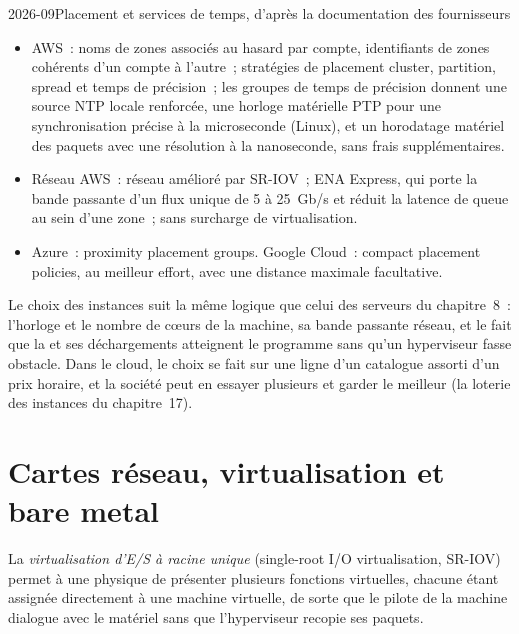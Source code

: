 \begin{dated}{2026-09}{Placement et services de temps, d'après la documentation des fournisseurs}\label{dat:nw:trading-in-a-public-cloud:docs}
\begin{itemize}
\item AWS~: noms de zones associés au hasard par compte, identifiants de zones cohérents d'un compte à l'autre~; stratégies de placement cluster, partition, spread et
  temps de précision~; les groupes de temps de précision donnent une source NTP locale renforcée, une horloge matérielle PTP pour une synchronisation précise à la microseconde (Linux),
  et un horodatage matériel des paquets avec une résolution à la nanoseconde, sans frais supplémentaires.
\item Réseau AWS~: réseau amélioré par SR-IOV~; ENA Express, qui porte la bande passante d'un flux unique de 5 à 25~Gb/s et réduit la
  latence de queue au sein d'une zone~;  sans surcharge de virtualisation.
\item Azure~: proximity placement groups. Google Cloud~: compact placement policies, au meilleur effort, avec une distance maximale facultative.
\end{itemize}
\end{dated}

Le choix des instances suit la même logique que celui des serveurs du chapitre~8~: l'horloge et le nombre de cœurs de la machine, sa bande passante réseau, et le fait que
la  et ses déchargements atteignent le programme sans qu'un hyperviseur fasse obstacle. Dans le cloud, le choix se fait sur une ligne d'un catalogue assorti
d'un prix horaire, et la société peut en essayer plusieurs et garder le meilleur (la loterie des instances du chapitre~17).

\section{Cartes réseau, virtualisation et bare metal}

\begin{definition}\label{def:nw:trading-in-a-public-cloud:sriov}
La \emph{virtualisation d'E/S à racine unique} (single-root I/O virtualisation, SR-IOV) permet à une  physique de présenter plusieurs fonctions virtuelles,
chacune étant assignée directement à une machine virtuelle, de sorte que le pilote de la machine dialogue avec le matériel sans que l'hyperviseur recopie ses
paquets.
\end{definition}

